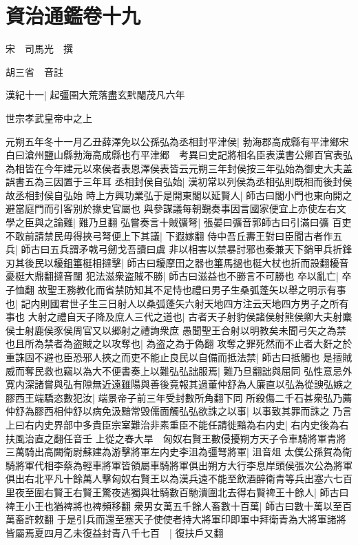 \chapter{資治通鑑卷十九}
宋　司馬光　撰

胡三省　音註

漢紀十一|{
	起彊圉大荒落盡玄黓閹茂凡六年}


世宗孝武皇帝中之上

元朔五年冬十一月乙丑薛澤免以公孫弘為丞相封平津侯|{
	勃海郡高成縣有平津鄉宋白曰滄州鹽山縣勃海高成縣也冇平津郷　考異曰史記將相名臣表漢書公卿百官表弘為相皆在今年建元以來侯者表恩澤侯表皆云元朔三年封侯按三年弘始為御史大夫盖誤書五為三因置于三年耳}
丞相封侯自弘始|{
	漢初常以列侯為丞相弘則既相而後封侯故丞相封侯自弘始}
時上方興功業弘于是開東閣以延賢人|{
	師古曰閣小門也東向開之避當庭門而引客别於掾史官屬也}
與參謀議每朝覲奏事因言國家便宜上亦使左右文學之臣與之論難|{
	難乃旦翻}
弘嘗奏言十賊彍弩|{
	張晏曰彍音郭師古曰引滿曰彍}
百吏不敢前請禁民毋得挾弓弩便上下其議|{
	下遐嫁翻}
侍中吾丘夀王對曰臣聞古者作五兵|{
	師古曰五兵謂矛戟弓劒戈吾讀曰虞}
非以相害以禁暴討邪也秦兼天下銷甲兵折鋒刃其後民以耰鉏箠梃相撻擊|{
	師古曰耰摩田之器也箠馬撾也梃大杖也折而設翻耰音憂梃大鼎翻撻音闥}
犯法滋衆盗賊不勝|{
	師古曰滋益也不勝言不可勝也}
卒以亂亡|{
	卒子恤翻}
故聖王務教化而省禁防知其不足恃也禮曰男子生桑弧蓬矢以舉之明示有事也|{
	記内則國君世子生三日射人以桑弧蓬矢六射天地四方注云天地四方男子之所有事也}
大射之禮自天子降及庶人三代之道也|{
	古者天子射豹侯諸侯射熊侯卿大夫射麋侯士射鹿侯豕侯周官又以郷射之禮詢衆庶}
愚聞聖王合射以明教矣未聞弓矢之為禁也且所為禁者為盗賊之以攻奪也|{
	為盗之為于偽翻}
攻奪之罪死然而不止者大姧之於重誅固不避也臣恐邪人挾之而吏不能止良民以自備而抵法禁|{
	師古曰抵觸也}
是擅賊威而奪民救也竊以為大不便書奏上以難弘弘詘服焉|{
	難乃旦翻詘與屈同}
弘性意忌外寛内深諸嘗與弘有隙無近遠雖陽與善後竟報其過董仲舒為人廉直以弘為從諛弘嫉之膠西王端驕恣數犯汝|{
	端景帝子前三年受封數所角翻下同}
所殺傷二千石甚衆弘乃薦仲舒為膠西相仲舒以病免汲黯常毁儒面觸弘弘欲誅之以事|{
	以事致其罪而誅之}
乃言上曰右内史界部中多貴臣宗室難治非素重臣不能任請徙黯為右内史|{
	右内史後為右扶風治直之翻任音壬}
上從之春大旱　匈奴右賢王數侵擾朔方天子令車騎將軍青將三萬騎出高闕衛尉蘇建為游擊將軍左内史李沮為彊弩將軍|{
	沮音俎}
太僕公孫賀為衛騎將軍代相李蔡為輕車將軍皆領屬車騎將軍俱出朔方大行李息岸頭侯張次公為將軍俱出右北平凡十餘萬人擊匈奴右賢王以為漢兵遠不能至飲酒醉衛青等兵出塞六七百里夜至圍右賢王右賢王驚夜逃獨與壮騎數百馳潰圍北去得右賢禆王十餘人|{
	師古曰禆王小王也猶禆將也禆頻移翻}
衆男女萬五千餘人畜數十百萬|{
	師古曰數十萬以至百萬畜許敕翻}
于是引兵而還至塞天子使使者持大將軍印即軍中拜衛青為大將軍諸將皆屬焉夏四月乙未復益封青八千七百　|{
	復扶戶又翻}
